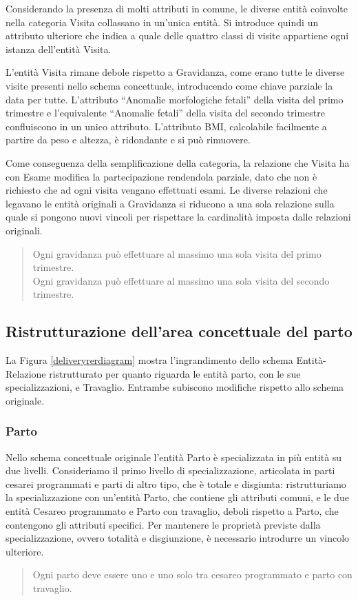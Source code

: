 Considerando la presenza di molti attributi in comune, le diverse entità coinvolte nella categoria Visita collassano in un'unica entità.
Si introduce quindi un attributo ulteriore che indica a quale delle quattro classi di visite appartiene ogni istanza dell'entità Visita.

L'entità Visita rimane debole rispetto a Gravidanza, come erano tutte le diverse visite presenti nello schema concettuale, introducendo come chiave parziale la data per tutte.
L'attributo \enquote{Anomalie morfologiche fetali} della visita del primo trimestre e l'equivalente \enquote{Anomalie fetali} della visita del secondo trimestre confluiscono in un unico attributo.
L'attributo BMI, calcolabile facilmente a partire da peso e altezza, è ridondante e si può rimuovere.

Come conseguenza della semplificazione della categoria, la relazione che Visita ha con Esame modifica la partecipazione rendendola parziale, dato che non è richiesto che ad ogni visita vengano effettuati esami.
Le diverse relazioni che legavano le entità originali a Gravidanza si riducono a una sola relazione sulla quale si pongono nuovi vincoli per rispettare la cardinalità imposta dalle relazioni originali.
\begin{quote}
Ogni gravidanza può effettuare al massimo una sola visita del primo trimestre. \\
Ogni gravidanza può effettuare al massimo una sola visita del secondo trimestre.
\end{quote}

\subsection{Ristrutturazione dell'area concettuale del parto}

La Figura \ref{deliveryrerdiagram} mostra l'ingrandimento dello schema Entità-Relazione ristrutturato per quanto riguarda le entità parto, con le sue specializzazioni, e Travaglio.
Entrambe subiscono modifiche rispetto allo schema originale.

\subsubsection{Parto}

Nello schema concettuale originale l'entità Parto è specializzata in più entità su due livelli.
Consideriamo il primo livello di specializzazione, articolata in parti cesarei programmati e parti di altro tipo, che è totale e disgiunta: ristrutturiamo la specializzazione con un'entità Parto, che contiene gli attributi comuni, e le due entità Cesareo programmato e Parto con travaglio, deboli rispetto a Parto, che contengono gli attributi specifici.
Per mantenere le proprietà previste dalla specializzazione, ovvero totalità e disgiunzione, è necessario introdurre un vincolo ulteriore.
\begin{quote}
Ogni parto deve essere uno e uno solo tra cesareo programmato e parto con travaglio.
\end{quote}

